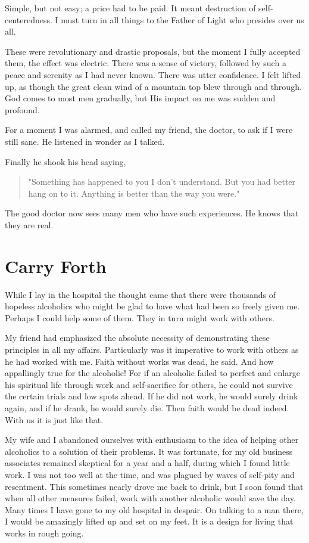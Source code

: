 Simple, but not easy; a price had to be paid.
It meant destruction of self-centeredness.
I must turn in all things to the Father of Light who presides over us all.

These were revolutionary and drastic proposals, but the moment I fully accepted them, the effect was electric.
There was a sense of victory, followed by such a peace and serenity as I had never known.
There was utter confidence.
I felt lifted up, as though the great clean wind of a mountain top blew through and through.
God comes to most men gradually, but His impact on me was sudden and profound.

For a moment I was alarmed, and called my friend, the doctor, to ask if I were still sane.
He listened in wonder as I talked.

Finally he shook his head saying,
\begin{quote}
"Something has happened to you I don't understand.
But you had better hang on to it.
Anything is better than the way you were."
\end{quote}
The good doctor now sees many men who have such experiences.
He knows that they are real.


\section{Carry Forth}

While I lay in the hospital the thought came that there were thousands of hopeless alcoholics who might be glad to have what had been so freely given me.
Perhaps I could help some of them.
They in turn might work with others.

My friend had emphasized the absolute necessity of demonstrating these principles in all my affairs.
Particularly was it imperative to work with others as he had worked with me.
Faith without works was dead, he said.
And how appallingly true for the alcoholic!
For if an alcoholic failed to perfect and enlarge his spiritual life through work and self-sacrifice for others, he could not survive the certain trials and low spots ahead.
If he did not work, he would surely drink again, and if he drank, he would surely die.
Then faith would be dead indeed.
With us it is just like that.

My wife and I abandoned ourselves with enthusiasm to the idea of helping other alcoholics to a solution of their problems.
It was fortunate, for my old business associates remained skeptical for a year and a half, during which I found little work.
I was not too well at the time, and was plagued by waves of self-pity and resentment.
This sometimes nearly drove me back to drink, but I soon found that when all other measures failed, work with another alcoholic would save the day.
Many times I have gone to my old hospital in despair.
On talking to a man there, I would be amazingly lifted up and set on my feet.
It is a design for living that works in rough going.

